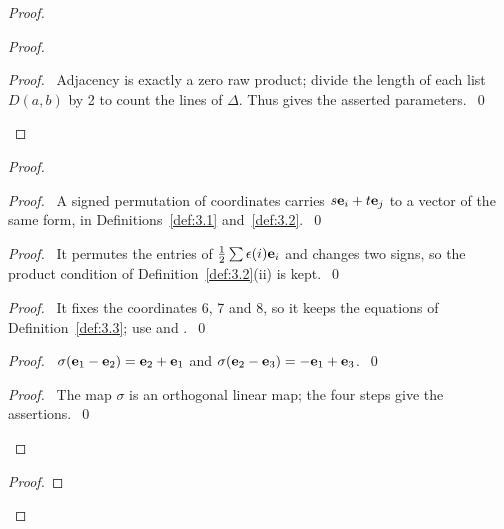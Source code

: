 \begin{proof}
\begin{proof}
  \qedstep
  \begin{proof}\pf\ Adjacency is exactly a zero raw product; divide the length of each list $D(a,b)$
   by 2 to count the lines of $\Delta$. Thus  gives the asserted parameters.~\qed\end{proof}
 \end{proof}
 \begin{proof}
  \begin{proof}\pf\ A signed permutation of coordinates carries $s{\mathbf e}_i+t{\mathbf e}_j$ to a vector
   of the same form, in Definitions~\ref{def:3.1} and~\ref{def:3.2}.~\qed\end{proof}
  \begin{proof}\pf\ It permutes the entries of $\frac12\sum\epsilon(i){\mathbf e}_i$ and changes
   two signs, so the product condition of Definition~\ref{def:3.2}(ii) is kept.~\qed\end{proof}
  \begin{proof}\pf\ It fixes the coordinates 6, 7 and 8, so it keeps the equations of
   Definition~\ref{def:3.3}; use  and .~\qed\end{proof}
  \begin{proof}\pf\ $\sigma({\mathbf e}_1-{\mathbf e}_2)={\mathbf e}_2+{\mathbf e}_1$ and
   $\sigma({\mathbf e}_2-{\mathbf e}_3)=-{\mathbf e}_1+{\mathbf e}_3$.~\qed\end{proof}
  \qedstep
  \begin{proof}\pf\ The map $\sigma$ is an orthogonal linear map; the four steps give the
   assertions.~\qed\end{proof}
 \end{proof}
 \begin{proof}
\end{proof}
\end{proof}
